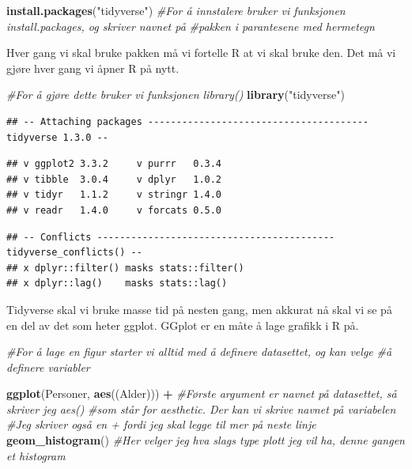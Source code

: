 \documentclass[
]{article}
\newenvironment{Shaded}{\begin{snugshade}}{\end{snugshade}}
\newcommand{\CommentTok}[1]{\textcolor[rgb]{0.56,0.35,0.01}{\textit{#1}}}
\newcommand{\KeywordTok}[1]{\textcolor[rgb]{0.13,0.29,0.53}{\textbf{#1}}}
\newcommand{\NormalTok}[1]{#1}
\newcommand{\OperatorTok}[1]{\textcolor[rgb]{0.81,0.36,0.00}{\textbf{#1}}}
\newcommand{\StringTok}[1]{\textcolor[rgb]{0.31,0.60,0.02}{#1}}
\begin{document}
\begin{Shaded}
\begin{Highlighting}[]
\KeywordTok{install.packages}\NormalTok{(}\StringTok{"tidyverse"}\NormalTok{)}
\CommentTok{#For å innstalere bruker vi funksjonen install.packages, og skriver navnet på}
\CommentTok{#pakken i parantesene med hermetegn}
\end{Highlighting}
\end{Shaded}

Hver gang vi skal bruke pakken må vi fortelle R at vi skal bruke den.
Det må vi gjøre hver gang vi åpner R på nytt.

\begin{Shaded}
\begin{Highlighting}[]
\CommentTok{#For å gjøre dette bruker vi funksjonen library()}
\KeywordTok{library}\NormalTok{(}\StringTok{"tidyverse"}\NormalTok{)}
\end{Highlighting}
\end{Shaded}

\begin{verbatim}
## -- Attaching packages --------------------------------------- tidyverse 1.3.0 --
\end{verbatim}

\begin{verbatim}
## v ggplot2 3.3.2     v purrr   0.3.4
## v tibble  3.0.4     v dplyr   1.0.2
## v tidyr   1.1.2     v stringr 1.4.0
## v readr   1.4.0     v forcats 0.5.0
\end{verbatim}

\begin{verbatim}
## -- Conflicts ------------------------------------------ tidyverse_conflicts() --
## x dplyr::filter() masks stats::filter()
## x dplyr::lag()    masks stats::lag()
\end{verbatim}

Tidyverse skal vi bruke masse tid på nesten gang, men akkurat nå skal vi
se på en del av det som heter ggplot. GGplot er en måte å lage grafikk i
R på.

\begin{Shaded}
\begin{Highlighting}[]
\CommentTok{#For å lage en figur starter vi alltid med å definere datasettet, og kan velge}
\CommentTok{#å definere variabler}

\KeywordTok{ggplot}\NormalTok{(Personer, }\KeywordTok{aes}\NormalTok{((Alder))) }\OperatorTok{+}\StringTok{ }\CommentTok{#Første argument er navnet på datasettet, så skriver jeg aes()}
\StringTok{                                 }\CommentTok{#som står for aesthetic. Der kan vi skrive navnet på variabelen}
\StringTok{                                 }\CommentTok{#Jeg skriver også en + fordi jeg skal legge til mer på neste linje}
\StringTok{  }\KeywordTok{geom_histogram}\NormalTok{() }\CommentTok{#Her velger jeg hva slags type plott jeg vil ha, denne gangen et histogram}
\end{Highlighting}
\end{Shaded}
\end{document}
